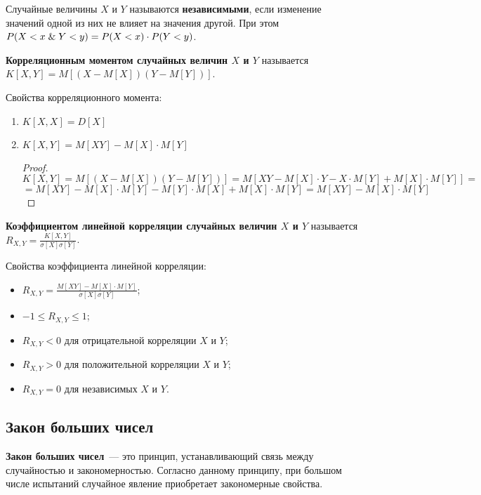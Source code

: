  Случайные величины $X$ и $Y$ называются \textbf{независимыми}, если изменение значений одной из них не влияет на значения другой.
При этом $P(X < x \mathrel{\&} Y < y) = P(X < x) \cdot P(Y < y)$.

 \textbf{Корреляционным моментом случайных величин $X$ и $Y$} называется $K[X, Y] = M[(X - M[X]) (Y - M[Y])]$.

Свойства корреляционного момента:
\begin{enumerate}
	\item $K[X, X] = D[X]$
	
	\item $K[X, Y] = M[XY] - M[X] \cdot M[Y]$
	\begin{proof}
	\begin{equation*}
	K[X, Y] =
	M[(X - M[X]) (Y - M[Y])] =
	M[XY - M[X] \cdot Y - X \cdot M[Y] + M[X] \cdot M[Y]] =
	\end{equation*}
	\begin{equation*}
	= M[XY] - M[X] \cdot M[Y] - M[Y] \cdot M[X] + M[X] \cdot M[Y] =
	M[XY] - M[X] \cdot M[Y]
	\end{equation*}
	\end{proof}
\end{enumerate}

 \textbf{Коэффициентом линейной корреляции случайных величин $X$ и $Y$} называется $\displaystyle R_{X,Y} = \frac{K[X, Y]}{\sigma[X] \sigma[Y]}$.

Свойства коэффициента линейной корреляции:
\begin{itemize}
	\item $\displaystyle R_{X,Y} = \frac{M[XY] - M[X] \cdot M[Y]}{\sigma[X] \sigma[Y]}$;

	\item $-1 \leqslant R_{X,Y} \leqslant 1$;
	
	\item $R_{X,Y} < 0$ для отрицательной корреляции $X$ и $Y$;
	
	\item $R_{X,Y} > 0$ для положительной корреляции $X$ и $Y$;
	
	\item $R_{X,Y} = 0$ для независимых $X$ и $Y$.
\end{itemize}

\subsection{Закон больших чисел}
\textbf{Закон больших чисел}~--- это принцип, устанавливающий связь между случайностью и закономерностью.
Согласно данному принципу, при большом числе испытаний случайное явление приобретает закономерные свойства.

